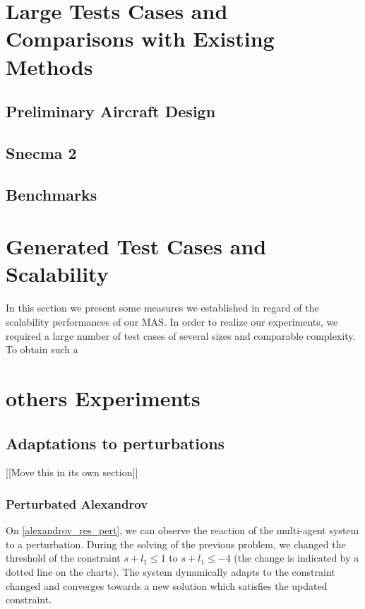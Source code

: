 \section{Large Tests Cases and Comparisons with Existing Methods}

\subsection{Preliminary Aircraft Design}

\subsection{Snecma 2}

\subsection{Benchmarks}

\section{Generated Test Cases and Scalability}

In this section we present some measures we established in regard of the scalability performances of our MAS. In order to realize our experiments, we required a large number of test cases of several sizes and comparable complexity.  To obtain such a 

\section{others Experiments}

\subsection{Adaptations to perturbations}

[[Move this in its own section]]
 
 \subsubsection{Perturbated Alexandrov}
 
On \figurename \ref{alexandrov_res_pert}, we can observe the reaction of the multi-agent system to a perturbation. During the solving of the previous problem, we changed the threshold of the constraint $s + l_1 \leq 1$ to $s + l_1 \leq -4$ (the change is indicated by a dotted line on the charts). The system dynamically adapts to the constraint changed and converges towards a new solution which satisfies the updated constraint.

